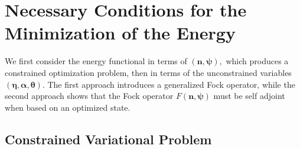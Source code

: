 \documentclass[aps,preprint]{revtex4}%
\begin{document}
\section{Necessary Conditions for the Minimization of the Energy
\label{Evariation}}

We first consider the energy functional in terms of $\left(  \mathbf{n,\psi
}\right)  ,$ which produces a constrained optimization problem, then in terms
of the unconstrained variables $\left(  \mathbf{\eta},\mathbf{\alpha
},\mathbf{\theta}\right)  $. The first approach introduces a generalized Fock
operator, while the second approach shows that the Fock operator $F\left(
\mathbf{n,\psi}\right)  $ must be self adjoint when based on an optimized state.

\subsection{Constrained Variational Problem\label{CVP}}
\end{document}
